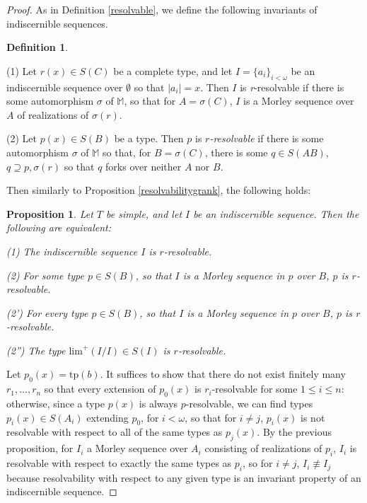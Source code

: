 \documentclass[11pt]{amsart}
\newtheorem{prop}[theorem]{Proposition}
\theoremstyle{definition}
\newtheorem{definition}[theorem]{Definition}
\theoremstyle{remark}
\numberwithin{equation}{section}
\begin{document}
\begin{proof}
    As in Definition \ref{resolvable}, we define the following invariants of indiscernible sequences.

    \begin{definition}
        \label{qresolvable}

        (1) Let $r(x) \in S(C)$ be a complete type, and let $I=\{a_{i}\}_{i < \omega}$ be an indiscernible sequence over $\emptyset$ so that $|a_{i}|= x$. Then $I$ is \textit{r}-resolvable if there is some automorphism $\sigma$ of $\mathbb{M}$, so that for $A = \sigma(C)$, $I$ is a Morley sequence over $A$ of realizations of $\sigma(r)$.  

        (2) Let $p(x) \in S(B)$ be a type. Then $p$ is \emph{$r$-resolvable} if there is some automorphism $\sigma$ of $\mathbb{M}$ so that, for $B = \sigma(C)$, there is some  $ q \in S(AB)$, $q \supseteq p, \sigma(r)$ so that $q$ forks over neither $A$ nor $B$.
    \end{definition}


Then similarly to Proposition \ref{resolvabilitygrank}, the following holds:

\begin{prop}\label{resolvabilitygrank2}
    Let $T$ be simple, and let $I$ be an indiscernible sequence. Then the following are equivalent:

    (1) The indiscernible sequence $I$ is $r$-resolvable.

    (2) For some type $p \in S(B)$, so that $I$ is a Morley sequence in $p$ over $B$, $p$ is $r$-resolvable.

    (2') For every type $p \in S(B)$, so that $I$ is a Morley sequence in $p$ over $B$, $p$ is $r$-resolvable.

    (2'') The type $\mathrm{lim}^{+}(I/I) \in S(I)$ is $r$-resolvable.

    
\end{prop}

Let $p_{0}(x) = \mathrm{tp}(b)$. It suffices to show that there do not exist finitely many $r_{1}, \ldots, r_{n}$ so that every extension of $p_{0}(x)$ is $r_{i}$-resolvable for some $1 \leq i \leq n$: otherwise, since a type $p(x)$ is always $p$-resolvable, we can find types $p_{i}(x) \in S(A_{i})$ extending $p_{0}$, for $i < \omega$, so that for $i \neq j$, $p_{i}(x)$ is not resolvable with respect to all of the same types as $p_{j}(x)$. By the previous proposition, for $I_{i}$ a Morley sequence over $A_{i}$ consisting of realizations of $p_{i}$, $I_{i}$ is resolvable with respect to exactly the same types as $p_{i}$, so for $i \neq j$, $I_{i} \not \equiv I_{j}$ because resolvability with respect to any given type is an invariant property of an indiscernible sequence.



\end{proof}
\end{document}
